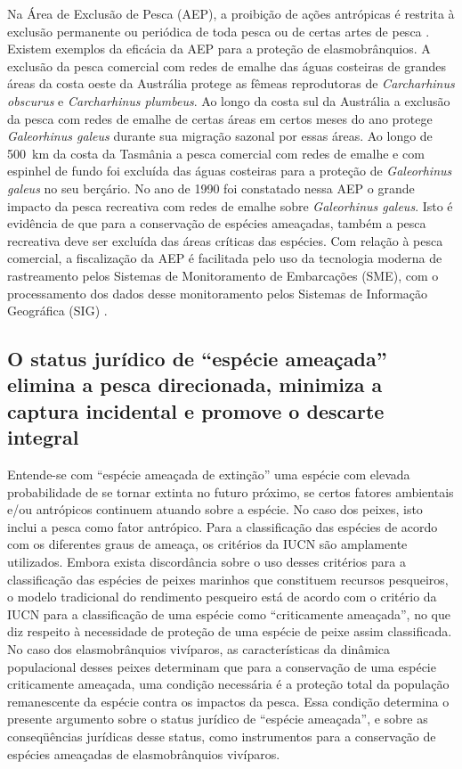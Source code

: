 \documentclass[a4paper,11pt,twoside,showtrims,onecolumn,openright,final]{memoir}
\begin{document}
Na  Área de Exclusão de Pesca (AEP), a proibição de ações antrópicas é restrita à exclusão 
permanente ou periódica de toda pesca ou de certas artes de pesca \citep{walker2004}. 
Existem exemplos da eficácia da AEP para a proteção de elasmobrânquios. A exclusão da pesca 
comercial com redes de emalhe das águas costeiras de grandes áreas da costa oeste da Austrália  
protege as fêmeas reprodutoras  de \emph{Carcharhinus obscurus} e \emph{Carcharhinus plumbeus}. 
Ao longo da costa sul da Austrália a exclusão da pesca com redes de emalhe de certas áreas em 
certos meses do ano protege \emph{Galeorhinus galeus} durante sua migração sazonal por essas áreas. 
Ao longo de 500~km da costa da Tasmânia a pesca comercial com redes de emalhe e com espinhel de fundo 
foi excluída das águas costeiras para a proteção de \emph{Galeorhinus galeus} no seu berçário. 
No ano de 1990 foi constatado nessa AEP o grande impacto da pesca recreativa com redes de emalhe 
sobre \emph{Galeorhinus galeus}. %
Isto é evidência de que para a conservação de espécies ameaçadas, também a pesca recreativa 
deve ser excluída  das áreas críticas das espécies. Com relação à pesca comercial, a fiscalização 
da AEP é facilitada pelo uso da tecnologia moderna de rastreamento pelos Sistemas de Monitoramento 
de Embarcações (SME), com o processamento dos dados desse monitoramento pelos 
Sistemas de Informação Geográfica (SIG) \citep{williams1992,walker2004}.

\subsection*{O status jurídico de ``espécie ameaçada''  elimina a pesca direcionada, 
             minimiza a captura incidental e promove o descarte integral}

Entende-se com ``espécie ameaçada de extinção'' uma espécie com elevada probabilidade de se 
tornar extinta no futuro próximo, se certos fatores ambientais e/ou antrópicos continuem atuando 
sobre a espécie. No caso dos peixes, isto inclui a pesca como fator antrópico. Para a classificação 
das espécies de acordo com os diferentes graus de ameaça, os critérios da IUCN são amplamente utilizados. 
Embora exista discordância sobre o uso desses critérios para a classificação das espécies de peixes marinhos 
que constituem recursos pesqueiros, o modelo tradicional do rendimento pesqueiro está de acordo com o critério 
da IUCN para a classificação de uma espécie como ``criticamente ameaçada'', no que diz respeito à 
necessidade de proteção de uma espécie de peixe assim classificada. No caso dos elasmobrânquios vivíparos, 
as características da dinâmica populacional desses peixes determinam que para a conservação de uma espécie 
criticamente ameaçada, uma condição necessária é a proteção total da população remanescente da espécie 
contra os impactos da pesca. Essa condição determina o presente argumento sobre o status jurídico 
de ``espécie ameaçada'', e sobre as conseqüências jurídicas desse status, como instrumentos para a 
conservação de espécies ameaçadas de elasmobrânquios vivíparos.
\end{document}

